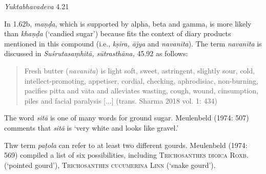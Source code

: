 \begin{ekdosis}
\begin{testimonia}[hp01_062]
\begin{versinnote}
\tl{\var{°phalapatraja° ] plalādika N,n1,J. yamīndra° ] yatīndra° N,n1,J}\\!}
\end{versinnote}

\emph{Yuktabhavadeva} 4.21

\begin{versinnote}
\end{versinnote}

\end{testimonia}

\begin{philcomm}[hp01_062]
In 1.62b, \emph{maṇḍa}, which is supported by alpha, beta and gamma, is more likely than \emph{khaṇḍa} (`candied sugar') because fits the context of diary products mentioned in this compound (i.e., \emph{kṣīra, ājya} and \emph{navanīta}). The term \emph{navanīta} is discussed in \emph{Suśrutasaṃhitā, sūtrasthāna,} 45.92 as follows:
\begin{quote}
Fresh butter (\emph{navanīta}) is light soft, sweet, astringent, slightly sour, cold, intellect-promoting, appetiser, cordial, checking, aphrodisiac, non-burning, pacifies pitta and vāta and alleviates wasting, cough, wound, cinsumption, piles and facial paralysis [...] (trans. Sharma 2018 vol. 1: 434)
\end{quote}

The word \emph{sitā} is one of many words for ground sugar. Meulenbeld (1974: 507) comments that \emph{sitā} is `very white and looks like gravel.'

Thw term \emph{paṭola} can refer to at least two different gourds. Meulenbeld (1974: 569) compiled a list of six possibilities, including \textsc{Trichosanthes dioica} \textsc{Roxb}. (`pointed gourd'), \textsc{Trichosanthes cucumerina} \textsc{Linn} (`snake gourd').


\end{philcomm}
\end{ekdosis}
